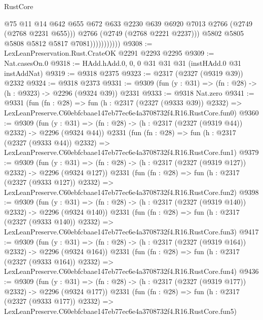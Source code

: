 \begin{lexlean}{RustCore}
\begin{coremodule}
                              @75
                              @11
                              @14
                              @642
                              @655
                              @672
                              @633
                              @2230
                              @639
                              @6920
                              @7013
                              @2766
                              (@2749 (@2768 @2231 @655)))
                            @2766
                            (@2749 (@2768 @2221 @2237)))
                          @5802
                          @5805
                          @5808
                          @5812
                          @5817
                          @7081)))))))))))
@9308 := LexLeanPreservation.Rust.CrateOK @2291 @2293 @2295
@9309 := Nat.casesOn.{0}
@9318 := HAdd.hAdd.{0, 0, 0} @31 @31 @31 (instHAdd.{0} @31 instAddNat)
@9319 := @9318 @2375
@9323 := @2317 (@2327 (@9319 @39)) @2332
@9324 := @9318 @2373
@9331 := @9309 (fun (y : @31) => (fn : @28) -> (h : @9323) -> @2296 (@9324 @39)) @2331
@9333 := @9318 Nat.zero
@9341 := @9331
    (fun (fn : @28) =>
    fun (h : @2317 (@2327 (@9333 @39)) @2332) =>
    LexLeanPreserve.C60ebfcbaae147eb77ec6e4a3708732f4.R16.RustCore.fun0)
@9360 := @9309
    (fun (y : @31) => (fn : @28) -> (h : @2317 (@2327 (@9319 @44)) @2332) -> @2296 (@9324 @44))
    @2331
    (fun (fn : @28) =>
    fun (h : @2317 (@2327 (@9333 @44)) @2332) =>
    LexLeanPreserve.C60ebfcbaae147eb77ec6e4a3708732f4.R16.RustCore.fun1)
@9379 := @9309
    (fun (y : @31) => (fn : @28) -> (h : @2317 (@2327 (@9319 @127)) @2332) -> @2296 (@9324 @127))
    @2331
    (fun (fn : @28) =>
    fun (h : @2317 (@2327 (@9333 @127)) @2332) =>
    LexLeanPreserve.C60ebfcbaae147eb77ec6e4a3708732f4.R16.RustCore.fun2)
@9398 := @9309
    (fun (y : @31) => (fn : @28) -> (h : @2317 (@2327 (@9319 @140)) @2332) -> @2296 (@9324 @140))
    @2331
    (fun (fn : @28) =>
    fun (h : @2317 (@2327 (@9333 @140)) @2332) =>
    LexLeanPreserve.C60ebfcbaae147eb77ec6e4a3708732f4.R16.RustCore.fun3)
@9417 := @9309
    (fun (y : @31) => (fn : @28) -> (h : @2317 (@2327 (@9319 @164)) @2332) -> @2296 (@9324 @164))
    @2331
    (fun (fn : @28) =>
    fun (h : @2317 (@2327 (@9333 @164)) @2332) =>
    LexLeanPreserve.C60ebfcbaae147eb77ec6e4a3708732f4.R16.RustCore.fun4)
@9436 := @9309
    (fun (y : @31) => (fn : @28) -> (h : @2317 (@2327 (@9319 @177)) @2332) -> @2296 (@9324 @177))
    @2331
    (fun (fn : @28) =>
    fun (h : @2317 (@2327 (@9333 @177)) @2332) =>
    LexLeanPreserve.C60ebfcbaae147eb77ec6e4a3708732f4.R16.RustCore.fun5)

\end{coremodule}
\end{lexlean}

